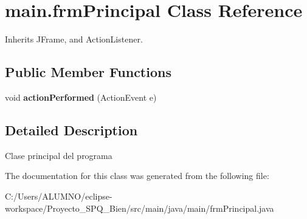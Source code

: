 \hypertarget{classmain_1_1frm_principal}{}\section{main.\+frm\+Principal Class Reference}
\label{classmain_1_1frm_principal}


Inherits J\+Frame, and Action\+Listener.

\subsection*{Public Member Functions}
\begin{DoxyCompactItemize}
\item 
\mbox{\label{classmain_1_1frm_principal_a1c1240fcc3aac8d3b3b211b2c6a581e7}} 
void {\bfseries action\+Performed} (Action\+Event e)
\end{DoxyCompactItemize}


\subsection{Detailed Description}
Clase principal del programa 

The documentation for this class was generated from the following file\+:\begin{DoxyCompactItemize}
\item 
C\+:/\+Users/\+A\+L\+U\+M\+N\+O/eclipse-\/workspace/\+Proyecto\+\_\+\+S\+P\+Q\+\_\+Bien/src/main/java/main/frm\+Principal.\+java\end{DoxyCompactItemize}
